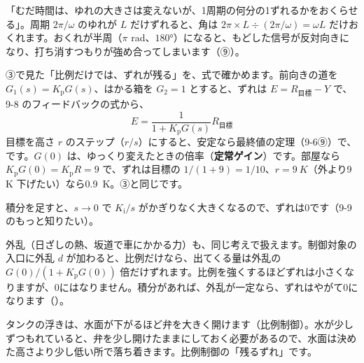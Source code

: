 \begin{phyomi}
「むだ時間は、ゆれの大きさは変えないが、1周期の何分の1ずれるかをおくらせる」。周期 $2\pi/\omega$ のゆれが $L$ だけずれると、角は $2\pi\times L\div(2\pi/\omega)=\omega L$ だけおくれます。おくれが半周（$\pi$ rad、$180°$）になると、もどした信号が反対向きになり、打ち消すつもりが強め合ってしまいます（⑨）。
\end{phyomi}

\label{ph:波-4:sec6}
③で見た「比例だけでは、ずれが残る」を、式で確かめます。前向きの道を $G_1(s)=K_{\mathrm p}G(s)$、はかる箱を $G_2=1$ とすると、ずれは $E=R_{\text{目標}}-Y$ で、9-8 のフィードバックの式から、
\[E=\frac{1}{1+K_{\mathrm p}G(s)}R_{\text{目標}}\]
目標を高さ $r$ のステップ（$r/s$）にすると、安定なら最終値の定理（9-6⑨）で、
です。$G(0)$ は、ゆっくり変えたときの倍率（\textbf{定常ゲイン}）です。部屋なら $K_{\mathrm p}G(0)=K_{\mathrm p}R=9$ で、ずれは目標の $1/(1+9)=1/10$、$r=\qty{9}{K}$（外より9 K 下げたい）なら\qty{0.9}{K}。③と同じです。

\begin{phflow}[残るずれ]
\end{phflow}
積分を足すと、$s\to0$ で $K_{\mathrm i}/s$ がかぎりなく大きくなるので、ずれは0です（9-9 のもっと知りたい）。

外乱（日ざしの熱、坂道で車にかかる力）も、同じ考えで扱えます。制御対象の入口に外乱 $d$ が加わると、比例だけなら、出てくる量は外乱の $G(0)/(1+K_{\mathrm p}G(0))$ 倍だけずれます。比例を強くするほどずれは小さくなりますが、0にはなりません。積分があれば、外乱が一定なら、ずれはやがて0になります（）。

\begin{phmijika}[トイレのタンクの浮き]
タンクの浮きは、水面が下がるほど弁を大きく開けます（比例制御）。水が少しずつもれていると、弁を少し開けたままにしておく必要があるので、水面は決めた高さより少し低い所で落ち着きます。比例制御の「残るずれ」です。
\end{phmijika}

